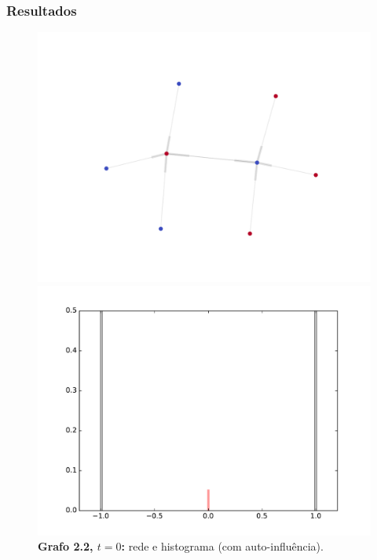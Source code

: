 \begin{frame}
  \frametitle{Resultados}

  \begin{figure}
  \centering
  \begin{minipage}{5.5cm}
    \includegraphics[width=\textwidth]{./figures/22SIN0}
  \end{minipage}
  \begin{minipage}{5.5cm}
    \includegraphics[width=\textwidth]{./figures/22SIH0}
  \end{minipage}
  \vspace{5mm}
  \caption*{\textbf{Grafo 2.2, $t = 0$:} rede e histograma (com auto-influência).}
  \end{figure}
\end{frame}

